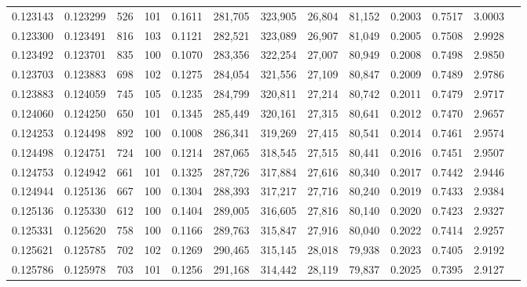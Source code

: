 \begin{tabular}{rrrrrrrrrrrrr}
0.123143 & 0.123299 &   526 & 101 &                                     0.1611 & 281,705 & 323,905 &  26,804 &  81,152 & 0.2003 & 0.7517 & 3.0003 \\
0.123300 & 0.123491 &   816 & 103 &                                     0.1121 & 282,521 & 323,089 &  26,907 &  81,049 & 0.2005 & 0.7508 & 2.9928 \\
0.123492 & 0.123701 &   835 & 100 &                                     0.1070 & 283,356 & 322,254 &  27,007 &  80,949 & 0.2008 & 0.7498 & 2.9850 \\
0.123703 & 0.123883 &   698 & 102 &                                     0.1275 & 284,054 & 321,556 &  27,109 &  80,847 & 0.2009 & 0.7489 & 2.9786 \\
0.123883 & 0.124059 &   745 & 105 &                                     0.1235 & 284,799 & 320,811 &  27,214 &  80,742 & 0.2011 & 0.7479 & 2.9717 \\
0.124060 & 0.124250 &   650 & 101 &                                     0.1345 & 285,449 & 320,161 &  27,315 &  80,641 & 0.2012 & 0.7470 & 2.9657 \\
0.124253 & 0.124498 &   892 & 100 &                                     0.1008 & 286,341 & 319,269 &  27,415 &  80,541 & 0.2014 & 0.7461 & 2.9574 \\
0.124498 & 0.124751 &   724 & 100 &                                     0.1214 & 287,065 & 318,545 &  27,515 &  80,441 & 0.2016 & 0.7451 & 2.9507 \\
0.124753 & 0.124942 &   661 & 101 &                                     0.1325 & 287,726 & 317,884 &  27,616 &  80,340 & 0.2017 & 0.7442 & 2.9446 \\
0.124944 & 0.125136 &   667 & 100 &                                     0.1304 & 288,393 & 317,217 &  27,716 &  80,240 & 0.2019 & 0.7433 & 2.9384 \\
0.125136 & 0.125330 &   612 & 100 &                                     0.1404 & 289,005 & 316,605 &  27,816 &  80,140 & 0.2020 & 0.7423 & 2.9327 \\
0.125331 & 0.125620 &   758 & 100 &                                     0.1166 & 289,763 & 315,847 &  27,916 &  80,040 & 0.2022 & 0.7414 & 2.9257 \\
0.125621 & 0.125785 &   702 & 102 &                                     0.1269 & 290,465 & 315,145 &  28,018 &  79,938 & 0.2023 & 0.7405 & 2.9192 \\
0.125786 & 0.125978 &   703 & 101 &                                     0.1256 & 291,168 & 314,442 &  28,119 &  79,837 & 0.2025 & 0.7395 & 2.9127 \\

\end{tabular}

